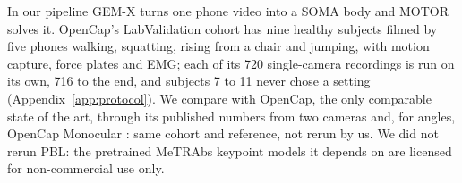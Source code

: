\documentclass[11pt]{article}
\begin{document}
In our pipeline GEM-X \cite{gemx,li2025genmo} turns one phone video into a SOMA body and MOTOR solves it. OpenCap's LabValidation
cohort \cite{uhlrich2023opencap} has nine healthy subjects filmed by five phones walking, squatting, rising from a
chair and jumping, with motion capture, force plates and EMG; each of its 720 single-camera recordings is run on its
own, 716 to the end, and subjects 7 to 11 never chose a setting (Appendix~\ref{app:protocol}). We compare with OpenCap, the only comparable state of the art, through its published
numbers from two cameras \cite{uhlrich2023opencap} and, for angles, OpenCap Monocular \cite{gilon2026monocular}: same
cohort and reference, not rerun by us. We did not rerun PBL: the pretrained MeTRAbs keypoint models
\cite{sarandi2021metrabs} it depends on are licensed for non-commercial use only.
\end{document}

